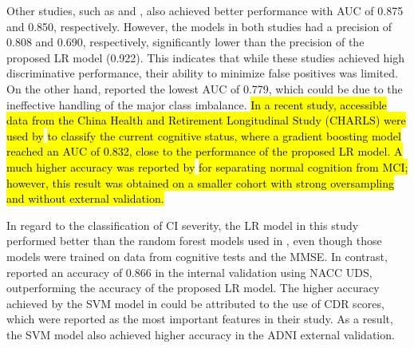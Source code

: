 Other studies, such as \cite{Cui2024Prediction} and \cite{Richter2025Cognitive}, also achieved better performance with AUC of 0.875 and 0.850, respectively. However, the models in both studies had a precision of 0.808 and 0.690, respectively, significantly lower than the precision of the proposed LR model (0.922). This indicates that while these studies achieved high discriminative performance, their ability to minimize false positives was limited. On the other hand,  reported the lowest AUC of 0.779, which could be due to the ineffective handling of the major class imbalance. \hl{In a recent study, accessible data from the China Health and Retirement Longitudinal Study (CHARLS) were used by}  \hl{to classify the current cognitive status, where a gradient boosting model reached an AUC of 0.832, close to the performance of the proposed LR model. A much higher accuracy was reported by}  \hl{for separating normal cognition from MCI; however, this result was obtained on a smaller cohort with strong oversampling and without external validation.}

In regard to the classification of CI severity, the LR model in this study performed better than the random forest models used in \cite{Bucholc2023Hybrid, Ren2023Improving}, even though those models were trained on data from cognitive tests and the MMSE. In contrast,  reported an accuracy of 0.866 in the internal validation using NACC UDS, outperforming the accuracy of the proposed LR model. The higher accuracy achieved by the SVM model in \cite{abbas2024Explainable} could be attributed to the use of CDR scores, which were reported as the most important features in their study. As a result, the SVM model also achieved higher accuracy in the ADNI external validation.

